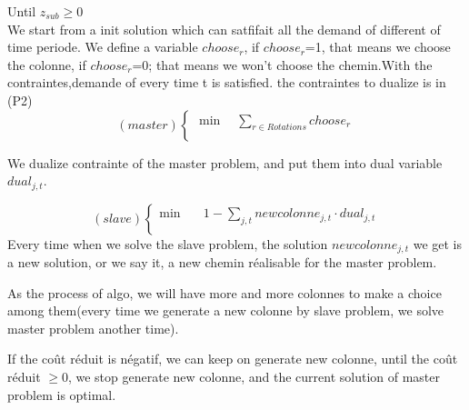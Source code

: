 \documentclass[a4paper]{article}
\begin{document}
	   		 Until $z_{sub} \geq 0$
\\

We start from a init solution which can satfifait all the demand of different of time periode. We define a variable $choose_r$, if $choose_r$=1, that means we choose the colonne, if $choose_r$=0;
that means we won't choose the chemin.With the contraintes,demande of every time t is satisfied. the contraintes to dualize is in (P2)
\begin{equation*}
    (master) \left\{ 
    \begin{aligned}
    \min\quad   \sum_{r \in Rotations } choose_{r}\\
  \end{aligned}
\right.
\end{equation*}

We dualize contrainte of the master problem, and put them into dual variable $dual_{j,t}$.  

\begin{equation*}
    (slave) \left\{ 
    \begin{aligned}
    \min\quad  & 1-\sum_{j,t} newcolonne_{j,t}\cdot dual_{j,t}\\
  \end{aligned}
\right.
\end{equation*}
Every time when we solve the slave problem, the solution $newcolonne_{j,t}$ we get is a new solution, or we say it, a new chemin réalisable for the master problem.

As the process of algo, we will have more and more colonnes to make a choice among them(every time we generate a new colonne by slave problem, we solve master problem another time).

If the coût réduit is négatif, we can keep on generate new colonne, until the coût réduit $\geq$0, we stop generate new colonne, and the current solution of master problem is optimal.
\end{document}
